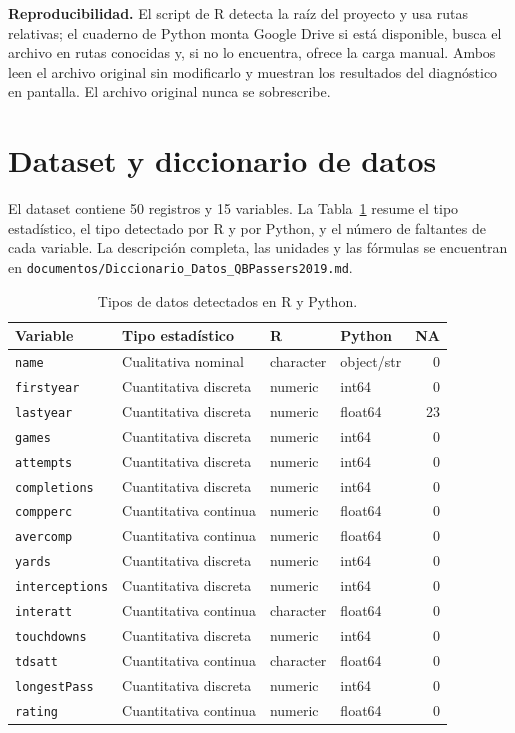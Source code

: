 \documentclass[11pt,a4paper]{article}
\begin{document}
\textbf{Reproducibilidad.} El script de R detecta la raíz del proyecto y usa rutas relativas; el cuaderno de Python monta Google Drive si está disponible, busca el archivo en rutas conocidas y, si no lo encuentra, ofrece la carga manual. Ambos leen el archivo original sin modificarlo y muestran los resultados del diagnóstico en pantalla. El archivo original nunca se sobrescribe.

\section{Dataset y diccionario de datos}
El dataset contiene 50 registros y 15 variables. La Tabla~\ref{tab:tipos} resume el tipo estadístico, el tipo detectado por R y por Python, y el número de faltantes de cada variable. La descripción completa, las unidades y las fórmulas se encuentran en \texttt{documentos/Diccionario\_Datos\_QBPassers2019.md}.

\begin{table}[H]
\centering
\footnotesize
\begin{tabular}{@{}p{2.45cm}p{3.45cm}p{2.05cm}p{2.25cm}r@{}}
\toprule
\textbf{Variable} & \textbf{Tipo estadístico} & \textbf{R} & \textbf{Python} & \textbf{NA} \\
\midrule
\texttt{name} & Cualitativa nominal & character & object/str & 0 \\
\texttt{firstyear} & Cuantitativa discreta & numeric & int64 & 0 \\
\texttt{lastyear} & Cuantitativa discreta & numeric & float64 & 23 \\
\texttt{games} & Cuantitativa discreta & numeric & int64 & 0 \\
\texttt{attempts} & Cuantitativa discreta & numeric & int64 & 0 \\
\texttt{completions} & Cuantitativa discreta & numeric & int64 & 0 \\
\texttt{compperc} & Cuantitativa continua & numeric & float64 & 0 \\
\texttt{avercomp} & Cuantitativa continua & numeric & float64 & 0 \\
\texttt{yards} & Cuantitativa discreta & numeric & int64 & 0 \\
\texttt{interceptions} & Cuantitativa discreta & numeric & int64 & 0 \\
\texttt{interatt} & Cuantitativa continua & character & float64 & 0 \\
\texttt{touchdowns} & Cuantitativa discreta & numeric & int64 & 0 \\
\texttt{tdsatt} & Cuantitativa continua & character & float64 & 0 \\
\texttt{longestPass} & Cuantitativa discreta & numeric & int64 & 0 \\
\texttt{rating} & Cuantitativa continua & numeric & float64 & 0 \\
\bottomrule
\end{tabular}
\caption{Tipos de datos detectados en R y Python.}
\label{tab:tipos}
\end{table}
\end{document}
